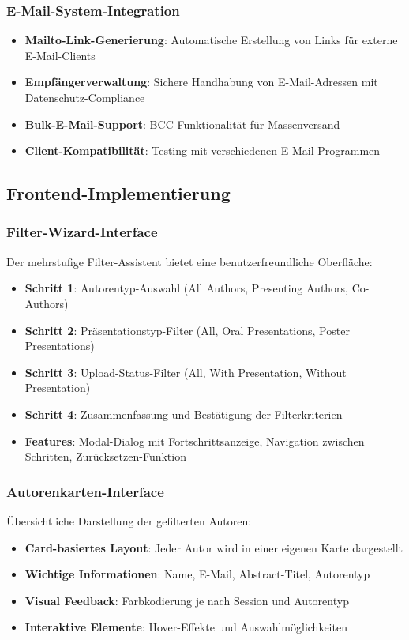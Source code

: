 \documentclass[11pt,a4paper]{article}
\begin{document}
\subsubsection{E-Mail-System-Integration}
\begin{itemize}
    \item \textbf{Mailto-Link-Generierung}: Automatische Erstellung von Links für externe E-Mail-Clients
    \item \textbf{Empfängerverwaltung}: Sichere Handhabung von E-Mail-Adressen mit Datenschutz-Compliance
    \item \textbf{Bulk-E-Mail-Support}: BCC-Funktionalität für Massenversand
    \item \textbf{Client-Kompatibilität}: Testing mit verschiedenen E-Mail-Programmen
\end{itemize}

\subsection{Frontend-Implementierung}

\subsubsection{Filter-Wizard-Interface}
Der mehrstufige Filter-Assistent bietet eine benutzerfreundliche Oberfläche:
\begin{itemize}
    \item \textbf{Schritt 1}: Autorentyp-Auswahl (All Authors, Presenting Authors, Co-Authors)
    \item \textbf{Schritt 2}: Präsentationstyp-Filter (All, Oral Presentations, Poster Presentations)
    \item \textbf{Schritt 3}: Upload-Status-Filter (All, With Presentation, Without Presentation)
    \item \textbf{Schritt 4}: Zusammenfassung und Bestätigung der Filterkriterien
    \item \textbf{Features}: Modal-Dialog mit Fortschrittsanzeige, Navigation zwischen Schritten, Zurücksetzen-Funktion
\end{itemize}

\subsubsection{Autorenkarten-Interface}
Übersichtliche Darstellung der gefilterten Autoren:
\begin{itemize}
    \item \textbf{Card-basiertes Layout}: Jeder Autor wird in einer eigenen Karte dargestellt
    \item \textbf{Wichtige Informationen}: Name, E-Mail, Abstract-Titel, Autorentyp
    \item \textbf{Visual Feedback}: Farbkodierung je nach Session und Autorentyp
    \item \textbf{Interaktive Elemente}: Hover-Effekte und Auswahlmöglichkeiten
\end{itemize}
\end{document}
